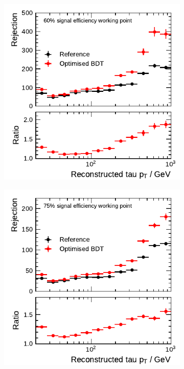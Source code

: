 \begin{figure}[htb]
  \centering
  \begin{subfigure}{0.48\textwidth}
    \centering
    \includegraphics{./figures/bdt_perf/post_optimisation/1p_highpt/rejection_tight_ratio_highpt.pdf}
  \end{subfigure}\hfill
  \begin{subfigure}{0.48\textwidth}
    \centering
    \includegraphics{./figures/bdt_perf/post_optimisation/1p_highpt/rejection_medium_ratio_highpt.pdf}

\end{subfigure}
\end{figure}
